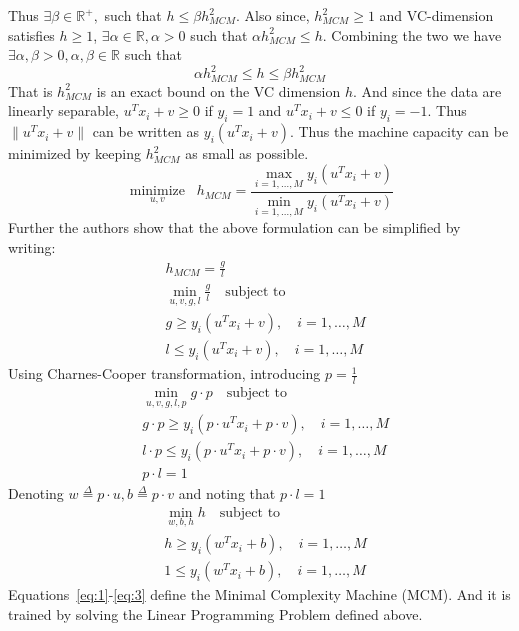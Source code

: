 \documentclass[11pt]{article}
\begin{document}
Thus $\exists\beta\in\mathbb{R}^+,$ such that $h\le\beta h_{MCM}^2$. Also since,
$h_{MCM}^2\ge 1$ and VC-dimension satisfies $h\ge 1$,
$\exists\alpha\in\mathbb{R},\alpha>0$ such that $\alpha h_{MCM}^2\le h$.
Combining the two we have $\exists \alpha,\beta > 0, \alpha,\beta\in\mathbb{R}$
such that
\begin{equation}
    \alpha h_{MCM}^2\le h\le\beta h_{MCM}^2
\end{equation}
That is $h^2_{MCM}$ is an exact bound on the VC dimension $h$. And since the
data are linearly separable, $u^Tx_i+v\ge 0$ if $y_i=1$ and $u^Tx_i+v\le 0$ if
$y_i=-1$. Thus $\lVert u^Tx_i+v\rVert$ can be written as $y_i(u^Tx_i+v)$. Thus
the machine capacity can be minimized by keeping $h_{MCM}^2$ as small as
possible.
\begin{equation}
    \underset{u,v}{\operatorname{minimize}}\;\; h_{MCM}=\frac{\max_{i=1,\dotsc,M}y_i(u^Tx_i+v)}{\min_{i=1,\dotsc,M}y_i(u^Tx_i+v)}
\end{equation}
Further the authors show that the above formulation can be simplified
by writing:
\begin{align}
    &h_{MCM}=\frac{g}{l}\\
    &\min_{u,v,g,l}\frac{g}{l}\quad\text{subject to}\\
    &g\ge y_i(u^Tx_i+v),\quad i=1,\dotsc,M\\
    &l\le y_i(u^Tx_i+v),\quad i=1,\dotsc,M
\end{align}
Using Charnes-Cooper transformation, introducing $p=\frac{1}{l}$
\begin{align}
    &\min_{u,v,g,l,p}g\cdot p\quad\text{subject to}\\
    &g\cdot p\ge y_i(p\cdot u^Tx_i+p\cdot v),\quad i=1,\dotsc,M\\
    &l\cdot p\le y_i(p\cdot u^Tx_i+p\cdot v),\quad i=1,\dotsc,M\\
    &p\cdot l=1
\end{align}
Denoting $w\stackrel{\Delta}{=}p\cdot u,b\stackrel{\Delta}{=}p\cdot v$ and
noting that $p\cdot l=1$
\begin{align}
    &\label{eq:1}\min_{w,b,h}h\quad\text{subject to}\\
    &\label{eq:2}h\ge y_i(w^Tx_i+b),\quad i=1,\dotsc,M\\
    &\label{eq:3}1\le y_i(w^Tx_i+b),\quad i=1,\dotsc,M
\end{align}
Equations~\ref{eq:1}-\ref{eq:3} define the Minimal Complexity Machine (MCM). And
it is trained by solving the Linear Programming Problem defined above.
\end{document}
